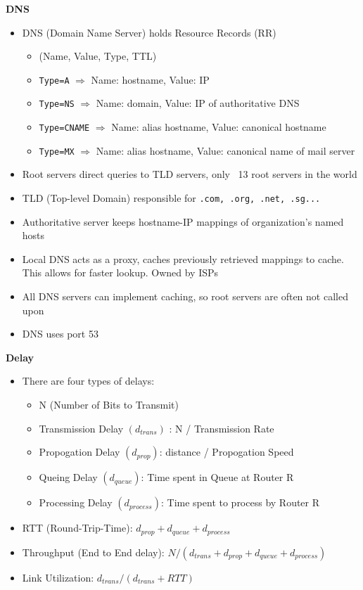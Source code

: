 \documentclass[a4paper]{article} \usepackage[backend=biber, style=numeric, sorting=none]{biblatex}
\begin{document}
\begin{multicols*}{4}
\textbf{DNS}
\begin{itemize}[leftmargin=*]
\item DNS (Domain Name Server) holds Resource Records (RR)
  \begin{itemize}[leftmargin=*]
  \item (Name, Value, Type, TTL)
  \item \texttt{Type=A} $\Rightarrow$ Name: hostname, Value: IP
  \item \texttt{Type=NS} $\Rightarrow$ Name: domain, Value: IP of authoritative DNS
  \item \texttt{Type=CNAME} $\Rightarrow$ Name: alias hostname, Value: canonical hostname
  \item \texttt{Type=MX} $\Rightarrow$ Name: alias hostname, Value: canonical name of mail server
  \end{itemize}
\item Root servers direct queries to TLD servers, only ~13 root servers in the world
\item TLD (Top-level Domain) responsible for \texttt{.com, .org, .net, .sg...}
\item Authoritative server keeps hostname-IP mappings of organization's named hosts
\item Local DNS acts as a proxy, caches previously retrieved mappings to cache. This allows for faster lookup. Owned by ISPs
\item All DNS servers can implement caching, so root servers are often not called upon
\item DNS uses port 53
\end{itemize}

\textbf{Delay}
\begin{itemize}[leftmargin=*]
\item There are four types of delays:
  \begin{itemize}[leftmargin=*]
  \item N (Number of Bits to Transmit)
  \item Transmission Delay $(d_{trans})$ : N / Transmission Rate
  \item Propogation Delay $(d_{prop})$: distance / Propogation Speed
  \item Queing Delay $(d_{queue})$: Time spent in Queue at Router R
  \item Processing Delay $(d_{process})$: Time spent to process by Router R
  \end{itemize}
\item RTT (Round-Trip-Time): $d_{prop} + d_{queue} + d_{process}$
\item Throughput (End to End delay): $N / (d_{trans} + d_{prop} + d_{queue} + d_{process})$
\item Link Utilization: $d_{trans} / (d_{trans} + RTT)$
\end{itemize}


\end{multicols*}
\end{document}

